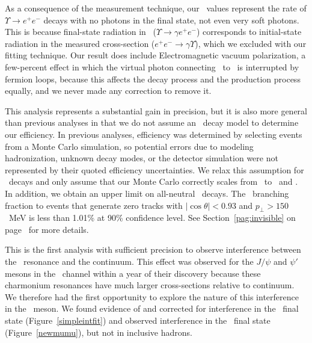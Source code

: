 \documentclass{cornell}
\begin{document}
As a consequence of the measurement technique, our \gee\ values
represent the rate of $\Upsilon \to e^+e^-$ decays with no photons in
the final state, not even very soft photons.  This is because
final-state radiation in \gee\ ($\Upsilon \to \gamma e^+e^-$)
corresponds to initial-state radiation in the measured cross-section
($e^+e^- \to \gamma \Upsilon$), which we excluded with our fitting
technique.  Our result does include Electromagnetic vacuum
polarization, a few-percent effect in which the virtual photon
connecting \ee\ to \ups\ is interrupted by fermion loops, because this
affects the decay process and the production process equally, and we
never made any correction to remove it.

This analysis represents a substantial gain in precision, but it is
also more general than previous analyses in that we do not assume an
\ups\ decay model to determine our efficiency.  In previous analyses,
efficiency was determined by selecting events from a Monte Carlo
simulation, so potential errors due to modeling hadronization, unknown
decay modes, or the detector simulation were not represented by their
quoted efficiency uncertainties.  We relax this assumption for \us\
decays and only assume that our Monte Carlo correctly scales from \us\ to
\uss\ and \usss.  In addition, we obtain an upper limit on all-neutral
\us\ decays.  The \us\ branching fraction to events that generate zero
tracks with $|\cos\theta| < 0.93$ and $p_\perp > 150$~MeV is less than
1.01\% at 90\% confidence level.  See Section~\ref{pag:invisible} on
page~\pageref{pag:invisible} for more details.

This is the first analysis with sufficient precision to observe
interference between the \us\ resonance and the continuum.  This
effect was observed for the $J/\psi$ and $\psi'$ mesons in the \mumu\
channel within a year of their discovery \cite{spear} \cite{spearb}
because these charmonium resonances have much larger cross-sections
relative to continuum.  We therefore had the first opportunity to
explore the nature of this interference in the \ups\ meson.  We found
evidence of and corrected for interference in the \qqbar\ final state
(Figure~\ref{simpleintfit}) and observed interference in the \mumu\
final state (Figure~\ref{newmumu}), but not in inclusive hadrons.
\end{document}
